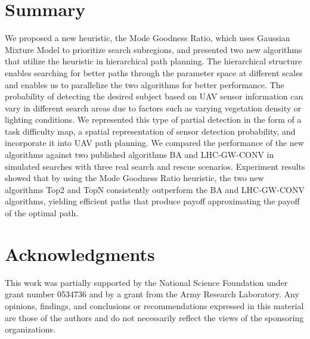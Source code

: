 \documentclass[journal]{IEEEtran}
\begin{document}
\section{Summary} 
\label{sec:Summary}

We proposed a new heuristic, the Mode Goodness Ratio, which uses Gaussian Mixture Model to prioritize search subregions, and presented two new algorithms that utilize the heuristic in hierarchical path planning. The hierarchical structure enables searching for better paths through the parameter space at different scales and enables us to parallelize the two algorithms for better performance. The probability of detecting the desired subject based on UAV sensor information can vary in different search areas due to factors such as varying vegetation density or lighting conditions. We represented this type of partial detection in the form of a task difficulty map, a spatial representation of sensor detection probability, and incorporate it into UAV path planning. We compared the performance of the new algorithms against two published algorithms BA and LHC-GW-CONV in simulated searches with three real search and rescue scenarios. Experiment results showed that by using the Mode Goodness Ratio heuristic, the two new algorithms Top2 and TopN consistently outperform the BA and LHC-GW-CONV algorithms, yielding efficient paths that produce payoff approximating the payoff of the optimal path.  


\section*{Acknowledgments}

This work was partially supported by 
the National Science Foundation 
under grant number 
0534736 
and by a grant from
the Army Research Laboratory.
Any opinions, findings, and conclusions or recommendations expressed in this material are those of the authors and do not necessarily reflect the views of the sponsoring organizations.




\end{document}
